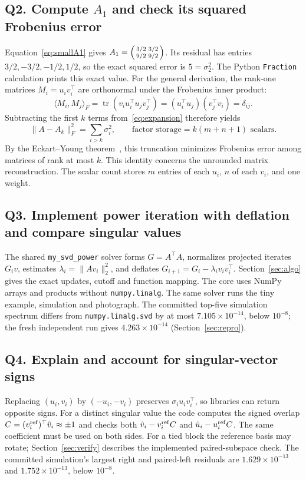 \documentclass[11pt,letterpaper]{article}
\numberwithin{equation}{section}
\newcommand{\tr}{\operatorname{tr}}
\newcommand{\fn}[1]{\texttt{#1}}
\begin{document}
\subsection*{Q2. Compute \(A_1\) and check its squared Frobenius error}
Equation~\eqref{eq:smallA1} gives $A_1=\begin{psmallmatrix}3/2&3/2\\9/2&9/2\end{psmallmatrix}$. Its residual has entries $3/2,-3/2,-1/2,1/2$, so the exact squared error is $5=\sigma_2^2$. The Python \fn{Fraction} calculation prints this exact value.
For the general derivation, the rank-one matrices $M_i=u_iv_i^\top$ are orthonormal under the Frobenius inner product:
\begin{equation}\label{eq:frobinner}
\langle M_i,M_j\rangle_F
=\tr(v_i u_i^\top u_j v_j^\top)
=(u_i^\top u_j)(v_j^\top v_i)=\delta_{ij}.
\end{equation}
Subtracting the first $k$ terms from~\eqref{eq:expansion} therefore yields
\begin{equation}\label{eq:tail}
\|A-A_k\|_F^2=\sum_{i>k}\sigma_i^2,\qquad
\text{factor storage}=k(m+n+1)\text{ scalars}.
\end{equation}
By the Eckart--Young theorem~\cite{eckart1936}, this truncation minimizes Frobenius error among matrices of rank at most $k$. This identity concerns the unrounded matrix reconstruction. The scalar count stores $m$ entries of each $u_i$, $n$ of each $v_i$, and one weight.

\subsection*{Q3. Implement power iteration with deflation and compare singular values}
The shared \fn{my\_svd\_power} solver forms $G=A^\top A$, normalizes projected iterates $G_i v$, estimates $\lambda_i=\|Av_i\|_2^2$, and deflates $G_{i+1}=G_i-\lambda_i v_i v_i^\top$. Section~\ref{sec:algo} gives the exact updates, cutoff and function mapping. The core uses NumPy arrays and products without \fn{numpy.linalg}. The same solver runs the tiny example, simulation and photograph. The committed top-five simulation spectrum differs from \fn{numpy.linalg.svd} by at most $7.105\times10^{-14}$, below $10^{-8}$; the fresh independent run gives $4.263\times10^{-14}$ (Section~\ref{sec:repro}).

\subsection*{Q4. Explain and account for singular-vector signs}
Replacing $(u_i,v_i)$ by $(-u_i,-v_i)$ preserves $\sigma_i u_i v_i^\top$, so libraries can return opposite signs. For a distinct singular value the code computes the signed overlap $C=(v_i^{\rm ref})^\top\hat v_i\approx\pm1$ and checks both $\hat v_i-v_i^{\rm ref}C$ and $\hat u_i-u_i^{\rm ref}C$. The same coefficient must be used on both sides. For a tied block the reference basis may rotate; Section~\ref{sec:verify} describes the implemented paired-subspace check. The committed simulation's largest right and paired-left residuals are $1.629\times10^{-13}$ and $1.752\times10^{-13}$, below $10^{-8}$.
\end{document}
